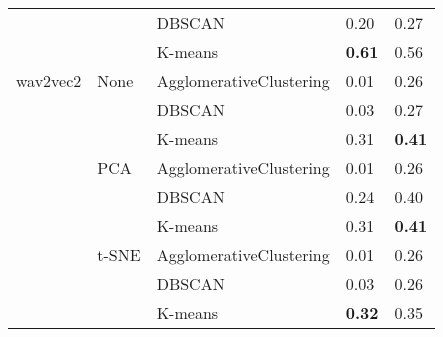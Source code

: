 \begin{tabular}{lllll}
         &      & DBSCAN &  0.20 &      0.27 \\
         &      & K-means &  \textbf{0.61} &      0.56 \\
\midrule
wav2vec2 & None & AgglomerativeClustering &  0.01 &      0.26 \\
         &      & DBSCAN &  0.03 &      0.27 \\
         &      & K-means &  0.31 &      \textbf{0.41} \\
         & PCA & AgglomerativeClustering &  0.01 &      0.26 \\
         &      & DBSCAN &  0.24 &      0.40 \\
         &      & K-means &  0.31 &      \textbf{0.41} \\
         & t-SNE & AgglomerativeClustering &  0.01 &      0.26 \\
         &      & DBSCAN &  0.03 &      0.26 \\
         &      & K-means &  \textbf{0.32} &      0.35 \\
\bottomrule
\end{tabular}

